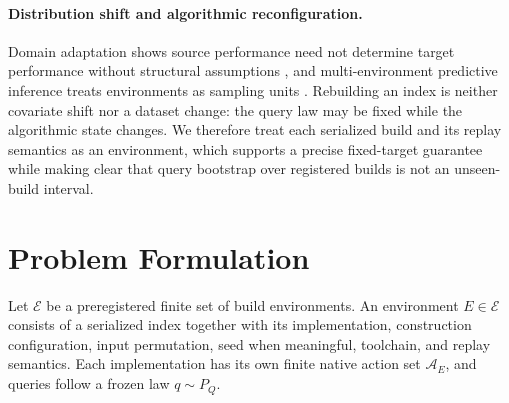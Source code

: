 \documentclass{article}
\newcommand{\Acal}{\mathcal{A}}
\newcommand{\Ecal}{\mathcal{E}}
\begin{document}
\paragraph{Distribution shift and algorithmic reconfiguration.}
Domain adaptation shows source performance need not determine target performance without structural
assumptions \citep{bendavid2010theory,johansson2019support}, and multi-environment predictive inference
treats environments as sampling units \citep{duchi2025multienv}. Rebuilding an index is neither covariate
shift nor a dataset change: the query law may be fixed while the algorithmic state changes. We therefore
treat each serialized build and its replay semantics as an environment, which supports a precise
fixed-target guarantee while making clear that query bootstrap over registered builds is not an
unseen-build interval.

\section{Problem Formulation}
\label{sec:formulation}

Let $\Ecal$ be a preregistered finite set of build environments. An environment $E\in\Ecal$ consists of a
serialized index together with its implementation, construction configuration, input permutation, seed when
meaningful, toolchain, and replay semantics. Each implementation has its own finite native action set
$\Acal_E$, and queries follow a frozen law $q\sim P_Q$.
\end{document}
